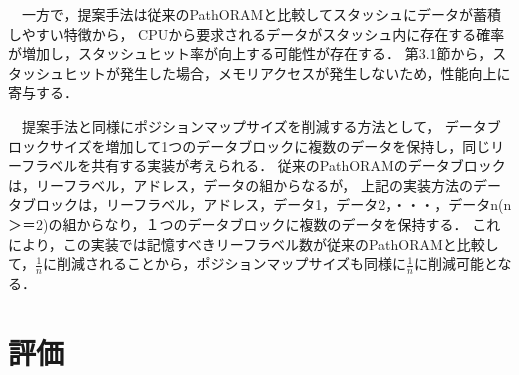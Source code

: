 \documentclass{jarticle}
\begin{document}
　一方で，提案手法は従来のPathORAMと比較してスタッシュにデータが蓄積しやすい特徴から，
CPUから要求されるデータがスタッシュ内に存在する確率が増加し，スタッシュヒット率が向上する可能性が存在する．
第3.1節から，スタッシュヒットが発生した場合，メモリアクセスが発生しないため，性能向上に寄与する．

　提案手法と同様にポジションマップサイズを削減する方法として，
データブロックサイズを増加して1つのデータブロックに複数のデータを保持し，同じリーフラベルを共有する実装が考えられる．
従来のPathORAMのデータブロックは，リーフラベル，アドレス，データの組からなるが，
上記の実装方法のデータブロックは，リーフラベル，アドレス，データ1，データ2，・・・，データn(n＞＝2)の組からなり，１つのデータブロックに複数のデータを保持する．
これにより，この実装では記憶すべきリーフラベル数が従来のPathORAMと比較して，$\frac{1}{n}$に削減されることから，ポジションマップサイズも同様に$\frac{1}{n}$に削減可能となる．







\section{評価}
\end{document}
